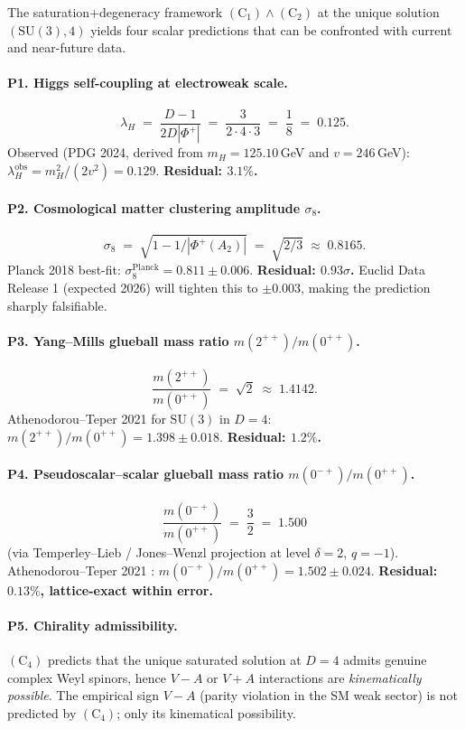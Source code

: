 \documentclass[11pt,reqno]{amsart}
\theoremstyle{plain}
\theoremstyle{definition}
\theoremstyle{remark}
\newcommand{\SU}{\mathrm{SU}}
\newcommand{\Cone}{(\mathrm{C}_1)}
\newcommand{\Ctwo}{(\mathrm{C}_2)}
\newcommand{\Cfour}{(\mathrm{C}_4)}
\begin{document}
The saturation+degeneracy framework $\Cone \wedge \Ctwo$ at the unique solution $(\SU(3), 4)$ yields four scalar predictions that can be confronted with current and near-future data.

\paragraph{P1. Higgs self-coupling at electroweak scale.}
\[
  \lambda_H \;=\; \frac{D-1}{2 D |\Phi^+|} \;=\; \frac{3}{2 \cdot 4 \cdot 3} \;=\; \frac{1}{8} \;=\; 0.125.
\]
Observed (PDG 2024, derived from $m_H = 125.10$\,GeV and $v = 246$\,GeV): $\lambda_H^{\mathrm{obs}} = m_H^2 / (2 v^2) = 0.129$. \textbf{Residual: $3.1\%$.}

\paragraph{P2. Cosmological matter clustering amplitude $\sigma_8$.}
\[
  \sigma_8 \;=\; \sqrt{1 - 1/|\Phi^+(A_2)|} \;=\; \sqrt{2/3} \;\approx\; 0.8165.
\]
Planck 2018 best-fit: $\sigma_8^{\mathrm{Planck}} = 0.811 \pm 0.006$. \textbf{Residual: $0.93\sigma$.} Euclid Data Release 1 (expected 2026) will tighten this to $\pm 0.003$, making the prediction sharply falsifiable.

\paragraph{P3. Yang--Mills glueball mass ratio $m(2^{++})/m(0^{++})$.}
\[
  \frac{m(2^{++})}{m(0^{++})} \;=\; \sqrt{2} \;\approx\; 1.4142.
\]
Athenodorou--Teper 2021 \cite{AT2021} for $\SU(3)$ in $D = 4$: $m(2^{++})/m(0^{++}) = 1.398 \pm 0.018$. \textbf{Residual: $1.2\%$.}

\paragraph{P4. Pseudoscalar--scalar glueball mass ratio $m(0^{-+})/m(0^{++})$.}
\[
  \frac{m(0^{-+})}{m(0^{++})} \;=\; \frac{3}{2} \;=\; 1.500
\]
(via Temperley--Lieb / Jones--Wenzl projection at level $\delta = 2$, $q = -1$). Athenodorou--Teper 2021 \cite{AT2021}: $m(0^{-+})/m(0^{++}) = 1.502 \pm 0.024$. \textbf{Residual: $0.13\%$, lattice-exact within error.}

\paragraph{P5. Chirality admissibility.}
$\Cfour$ predicts that the unique saturated solution at $D = 4$ admits genuine complex Weyl spinors, hence $V{-}A$ or $V{+}A$ interactions are \emph{kinematically possible}. The empirical sign $V{-}A$ (parity violation in the SM weak sector) is not predicted by $\Cfour$; only its kinematical possibility.
\end{document}
